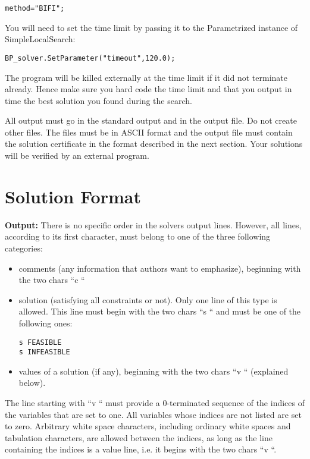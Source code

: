 \begin{verbatim}
method="BIFI";
\end{verbatim}

You will need to set the time limit by passing it to the Parametrized
instance of SimpleLocalSearch:

\begin{verbatim}
BP_solver.SetParameter("timeout",120.0);
\end{verbatim}

The program will be killed externally at the time limit if it did not
terminate already. Hence make sure you hard code the time limit and that
you output in time the best solution you found during the search.

All output must go in the standard output and in the output file. Do not
create other files.  The files must be in ASCII format and the output
file must contain the solution certificate in the format described in
the next section. Your solutions will be verified by an external program.

\section{Solution Format}
\label{a2}

   \textbf{Output:} There is no specific order in the solvers output
    lines. However, all lines, according to its first character, must belong
    to one of the three following categories:

    \begin{itemize}
    \item comments (any information that authors want to emphasize), beginning with the two chars ``c ``
    \item solution (satisfying all constraints or not). Only one line of this type is
      allowed. This line must begin with the two chars ``s `` and must be
      one of the following ones:
\begin{verbatim}
s FEASIBLE
s INFEASIBLE
\end{verbatim}
    \item values of a solution (if any), beginning with the two chars
      ``v `` (explained below).
    \end{itemize}
 

    The line starting with ``v `` must provide a 0-terminated sequence
    of  the indices of
the variables that are set to one. All variables whose indices are not
listed are set to zero. 
Arbitrary white
    space characters, including ordinary white spaces and tabulation
    characters, are allowed between the indices, as long as the line
    containing the indices is a value line, i.e. it begins with the
    two chars ``v ``.

